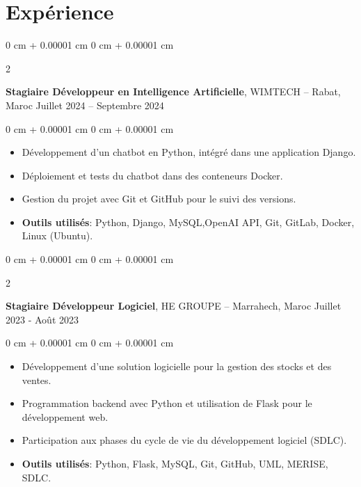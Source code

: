 \documentclass[10pt, letterpaper]{article}
\newenvironment{highlights}{
    \begin{itemize}[
        topsep=0.10 cm,
        parsep=0.10 cm,
        partopsep=0pt,
        itemsep=0pt,
        leftmargin=0 cm + 10pt
    ]
}{
    \end{itemize}
} %
\newenvironment{onecolentry}{
    \begin{adjustwidth}{
        0 cm + 0.00001 cm
    }{
        0 cm + 0.00001 cm
    }
}{
    \end{adjustwidth}
} %
\newenvironment{twocolentry}[2][]{
    \onecolentry
    \def\secondColumn{#2}
    \setcolumnwidth{\fill, 5 cm}
    \begin{paracol}{2}
}{
    \switchcolumn \raggedleft \secondColumn
    \end{paracol}
    \endonecolentry
} %
\begin{document}
        

    
    \section{Expérience}
        
        \begin{twocolentry}{
            Juillet 2024 – Septembre 2024
        }
            \textbf{Stagiaire Développeur en Intelligence Artificielle}, WIMTECH -- Rabat, Maroc\end{twocolentry}

        \vspace{0.10 cm}
        \begin{onecolentry}
            \begin{highlights}
                \item Développement d’un chatbot en Python, intégré dans une application Django.
                \item Déploiement et tests du chatbot dans des conteneurs Docker.
                \item Gestion du projet avec Git et GitHub pour le suivi des versions.
                \item \textbf{Outils utilisés}: 
                Python, Django, MySQL,OpenAI API, Git, GitLab, Docker, Linux (Ubuntu).
                
            \end{highlights}
        \end{onecolentry}


        \vspace{0.5 cm}

        \begin{twocolentry}{
            Juillet 2023 - Août 2023
        }
            \textbf{Stagiaire Développeur Logiciel}, HE GROUPE -- Marrahech, Maroc\end{twocolentry}

        \vspace{0.10 cm}
        \begin{onecolentry}
            \begin{highlights}
                \item Développement d’une solution logicielle pour la gestion des stocks et des ventes.
                \item Programmation backend avec Python et utilisation de Flask pour le développement web.
                \item Participation aux phases du cycle de vie du développement logiciel (SDLC).
                \item \textbf{Outils utilisés}: Python, Flask, MySQL, Git, GitHub, UML, MERISE, SDLC.
            \end{highlights}
        \end{onecolentry}
\end{document}
